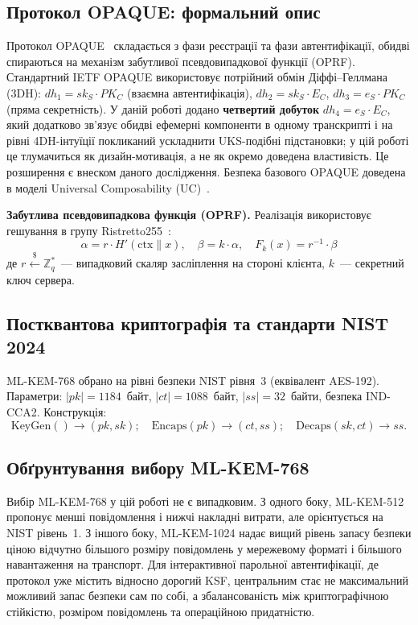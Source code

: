 \documentclass{llncs}
\begin{document}
\subsection{Протокол OPAQUE: формальний опис}

Протокол OPAQUE~\cite{jarecki2018} складається з фази реєстрації та
фази автентифікації, обидві спираються на механізм забутливої
псевдовипадкової функції (OPRF). Стандартний IETF OPAQUE використовує потрійний обмін Діффі--Геллмана (3DH):
$dh_1 = sk_S \cdot PK_C$ (взаємна автентифікація), $dh_2 = sk_S \cdot E_C$,
$dh_3 = e_S \cdot PK_C$ (пряма секретність). У даній роботі додано
\textbf{четвертий добуток} $dh_4 = e_S \cdot E_C$, який додатково
зв'язує обидві ефемерні компоненти в одному транскрипті і на рівні
4DH-інтуїції покликаний ускладнити UKS-подібні підстановки; у цій
роботі це тлумачиться як дизайн-мотивація, а не як окремо доведена
властивість. Це розширення є внеском даного дослідження.
Безпека базового OPAQUE доведена в моделі Universal Composability
(UC)~\cite{canetti2001}.

\textbf{Забутлива псевдовипадкова функція (OPRF).} Реалізація
використовує гешування в групу Ristretto255~\cite{devalence2024}:
\begin{equation}
  \alpha = r \cdot H'(\mathrm{ctx} \| x),\quad
  \beta = k \cdot \alpha,\quad
  F_k(x) = r^{-1} \cdot \beta
  \label{eq:oprf-core}
\end{equation}
де $r \xleftarrow{\$} \mathbb{Z}_q^*$~--- випадковий скаляр
засліплення на стороні клієнта, $k$~--- секретний ключ сервера.

\subsection{Постквантова криптографія та стандарти NIST 2024}

ML-KEM-768 обрано на рівні безпеки NIST рівня~3 (еквівалент AES-192).
Параметри: $|pk| = 1184$~байт, $|ct| = 1088$~байт, $|ss| = 32$~байти,
безпека IND-CCA2. Конструкція:
\begin{equation}
  \mathrm{KeyGen}() \to (pk, sk);\quad
  \mathrm{Encaps}(pk) \to (ct, ss);\quad
  \mathrm{Decaps}(sk, ct) \to ss.
\end{equation}

\subsection{Обґрунтування вибору ML-KEM-768}

Вибір ML-KEM-768 у цій роботі не є випадковим. З одного боку,
ML-KEM-512 пропонує менші повідомлення і нижчі накладні витрати, але
орієнтується на NIST рівень~1. З іншого боку, ML-KEM-1024 надає вищий
рівень запасу безпеки ціною відчутно більшого розміру повідомлень у мережевому форматі
і більшого навантаження на транспорт. Для інтерактивної парольної
автентифікації, де протокол уже містить відносно дорогий KSF,
центральним стає не максимальний можливий запас безпеки сам по собі, а
збалансованість між криптографічною стійкістю, розміром повідомлень та
операційною придатністю.
\end{document}
